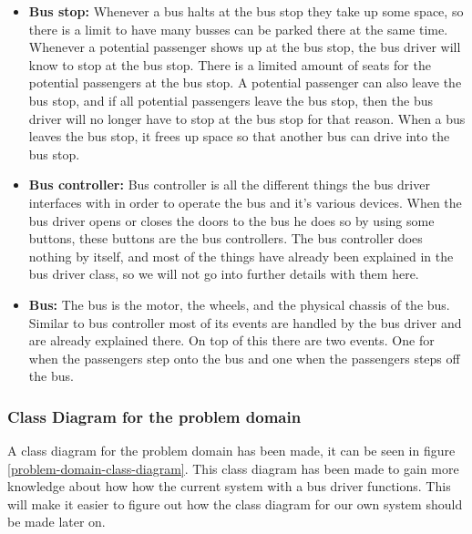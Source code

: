 \begin{itemize}
\item \textbf{Bus stop:}
Whenever a bus halts at the bus stop they take up some space, so there is a limit to have many busses can be parked there at the same time. Whenever a potential passenger shows up at the bus stop, the bus driver will know to stop at the bus stop. There is a limited amount of seats for the potential passengers at the bus stop. A potential passenger can also leave the bus stop, and if all potential passengers leave the bus stop, then the bus driver will no longer have to stop at the bus stop for that reason. When a bus leaves the bus stop, it frees up space so that another bus can drive into the bus stop.
\item \textbf{Bus controller:}
Bus controller is all the different things the bus driver interfaces with in order to operate the bus and it's various devices. When the bus driver opens or closes the doors to the bus he does so by using some buttons, these buttons are the bus controllers. The bus controller does nothing by itself, and most of the things have already been explained in the bus driver class, so we will not go into further details with them here.
\item \textbf{Bus:}
The bus is the motor, the wheels, and the physical chassis of the bus. Similar to bus controller most of its events are handled by the bus driver and are already explained there. On top of this there are two events. One for when the passengers step onto the bus and one when the passengers steps off the bus.
\end{itemize}


\subsubsection{Class Diagram for the problem domain}

A class diagram for the problem domain has been made, it can be seen in figure \ref{problem-domain-class-diagram}. This class diagram has been made to gain more knowledge about how how the current system with a bus driver functions. This will make it easier to figure out how the class diagram for our own system should be made later on.

